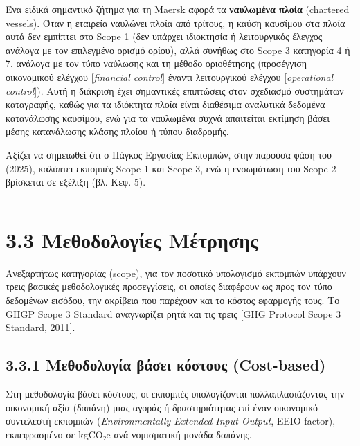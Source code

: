 \documentclass[11pt,a4paper,greek,twoside]{template-xe}
\begin{document}
Ένα ειδικά σημαντικό ζήτημα για τη Maersk αφορά τα \textbf{ναυλωμένα
πλοία} (chartered vessels). Όταν η εταιρεία ναυλώνει πλοία από τρίτους,
η καύση καυσίμου στα πλοία αυτά δεν εμπίπτει στο Scope 1 (δεν υπάρχει
ιδιοκτησία ή λειτουργικός έλεγχος ανάλογα με τον επιλεγμένο ορισμό
ορίου), αλλά συνήθως στο Scope 3 κατηγορία 4 ή 7, ανάλογα με τον τύπο
ναύλωσης και τη μέθοδο οριοθέτησης (προσέγγιση οικονομικού ελέγχου
{[}\emph{financial control}{]} έναντι λειτουργικού ελέγχου
{[}\emph{operational control}{]}). Αυτή η διάκριση έχει σημαντικές
επιπτώσεις στον σχεδιασμό συστημάτων καταγραφής, καθώς για τα ιδιόκτητα
πλοία είναι διαθέσιμα αναλυτικά δεδομένα κατανάλωσης καυσίμου, ενώ για
τα ναυλωμένα συχνά απαιτείται εκτίμηση βάσει μέσης κατανάλωσης κλάσης
πλοίου ή τύπου διαδρομής.

Αξίζει να σημειωθεί ότι ο Πάγκος Εργασίας Εκπομπών, στην παρούσα φάση
του (2025), καλύπτει εκπομπές Scope 1 και Scope 3, ενώ η ενσωμάτωση του
Scope 2 βρίσκεται σε εξέλιξη (βλ. Κεφ. 5).

\begin{center}\rule{0.5\linewidth}{0.5pt}\end{center}

\section{3.3 Μεθοδολογίες
Μέτρησης}\label{ux3bcux3b5ux3b8ux3bfux3b4ux3bfux3bbux3bfux3b3ux3afux3b5ux3c2-ux3bcux3adux3c4ux3c1ux3b7ux3c3ux3b7ux3c2}

Ανεξαρτήτως κατηγορίας (scope), για τον ποσοτικό υπολογισμό εκπομπών
υπάρχουν τρεις βασικές μεθοδολογικές προσεγγίσεις, οι οποίες διαφέρουν
ως προς τον τύπο δεδομένων εισόδου, την ακρίβεια που παρέχουν και το
κόστος εφαρμογής τους. Το GHGP Scope 3 Standard αναγνωρίζει ρητά και τις
τρεις {[}GHG Protocol Scope 3 Standard, 2011{]}.

\subsection{3.3.1 Μεθοδολογία βάσει κόστους
(Cost-based)}\label{ux3bcux3b5ux3b8ux3bfux3b4ux3bfux3bbux3bfux3b3ux3afux3b1-ux3b2ux3acux3c3ux3b5ux3b9-ux3baux3ccux3c3ux3c4ux3bfux3c5ux3c2-cost-based}

Στη μεθοδολογία βάσει κόστους, οι εκπομπές υπολογίζονται
πολλαπλασιάζοντας την οικονομική αξία (δαπάνη) μιας αγοράς ή
δραστηριότητας επί έναν οικονομικό συντελεστή εκπομπών
(\emph{Environmentally Extended Input-Output}, EEIO factor),
εκπεφρασμένο σε kgCO₂e ανά νομισματική μονάδα δαπάνης.
\end{document}
